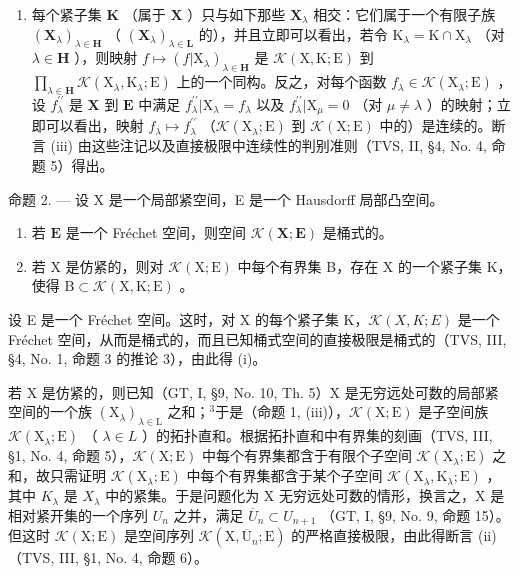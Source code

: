 \begin{enumerate}
\item
  每个紧子集 \(\mathbf{K}\) （属于 \(\mathbf{X}\) ）只与如下那些 \(\mathbf{X}_{\lambda}\) 相交：它们属于一个有限子族 \((\mathbf{X}_{\lambda})_{\lambda \in \mathbf{H}}\) （ \((\mathbf{X}_{\lambda})_{\lambda \in \mathbf{L}}\) 的），并且立即可以看出，若令 \(\mathrm{K}_{\lambda} = \mathrm{K} \cap \mathrm{X}_{\lambda}\) （对 \(\lambda \in \mathbf{H}\) ），则映射 \(f \mapsto (f|\mathrm{X}_{\lambda})_{\lambda \in \mathbf{H}}\) 是 \(\mathcal{K}(\mathrm{X},\mathrm{K};\mathrm{E})\) 到 \(\prod_{\lambda \in \mathbf{H}} \mathcal{K}(\mathrm{X}_{\lambda},\mathrm{K}_{\lambda};\mathrm{E})\) 上的一个同构。反之，对每个函数 \(f_{\lambda} \in \mathcal{K}(\mathrm{X}_{\lambda};\mathrm{E})\) ，设 \(f_{\lambda}^{\prime \prime}\) 是 \(\mathbf{X}\) 到 \(\mathbf{E}\) 中满足 \(f_{\lambda}^{\prime \prime}|\mathrm{X}_{\lambda} = f_{\lambda}\) 以及 \(f_{\lambda}^{\prime \prime}|\mathrm{X}_{\mu} = 0\) （对 \(\mu \neq \lambda\) ）的映射；立即可以看出，映射 \(f_{\lambda} \mapsto f_{\lambda}^{\prime \prime}\) （\(\mathcal{K}(\mathrm{X}_{\lambda};\mathrm{E})\) 到 \(\mathcal{K}(\mathrm{X};\mathrm{E})\) 中的）是连续的。断言 (iii) 由这些注记以及直接极限中连续性的判别准则（TVS, II, §4, No. 4, 命题 5）得出。
\end{enumerate}

命题 2. --- 设 X 是一个局部紧空间，E 是一个 Hausdorff 局部凸空间。

\begin{enumerate}
\def\labelenumi{(\roman{enumi})}
\item
  若 \(\mathbf{E}\) 是一个 Fréchet 空间，则空间 \(\mathcal{K}(\mathbf{X};\mathbf{E})\) 是桶式的。
\item
  若 X 是仿紧的，则对 \(\mathcal{K}(\mathrm{X};\mathrm{E})\) 中每个有界集 B，存在 X 的一个紧子集 K，使得 \(\mathrm{B}\subset \mathcal{K}(\mathrm{X},\mathrm{K};\mathrm{E})\) 。
\end{enumerate}

设 E 是一个 Fréchet 空间。这时，对 X 的每个紧子集 K，\(\mathcal{K}(X,K;E)\) 是一个 Fréchet 空间，从而是桶式的，而且已知桶式空间的直接极限是桶式的（TVS, III, §4, No. 1, 命题 3 的推论 3），由此得 (i)。

若 X 是仿紧的，则已知（GT, I, §9, No. 10, Th. 5）X 是无穷远处可数的局部紧空间的一个族 \((\mathrm{X}_{\lambda})_{\lambda \in \mathrm{L}}\) 之和；\(^{3}\)于是（命题 1, (iii)），\(\mathcal{K}(\mathrm{X};\mathrm{E})\) 是子空间族 \(\mathcal{K}(\mathrm{X}_{\lambda};\mathrm{E})\) （ \(\lambda \in L\) ）的拓扑直和。根据拓扑直和中有界集的刻画（TVS, III, §1, No. 4, 命题 5），\(\mathcal{K}(\mathrm{X};\mathrm{E})\) 中每个有界集都含于有限个子空间 \(\mathcal{K}(\mathrm{X}_{\lambda};\mathrm{E})\) 之和，故只需证明 \(\mathcal{K}(\mathrm{X}_{\lambda};\mathrm{E})\) 中每个有界集都含于某个子空间 \(\mathcal{K}(\mathrm{X}_{\lambda},\mathrm{K}_{\lambda};\mathrm{E})\) ，其中 \(K_{\lambda}\) 是 \(X_{\lambda}\) 中的紧集。于是问题化为 X 无穷远处可数的情形，换言之，X 是相对紧开集的一个序列 \(U_{n}\) 之并，满足 \(\overline{U}_{n} \subset U_{n+1}\) （GT, I, §9, No. 9, 命题 15）。但这时 \(\mathcal{K}(\mathrm{X};\mathrm{E})\) 是空间序列 \(\mathcal{K}(\mathrm{X},\overline{\mathrm{U}}_{n};\mathrm{E})\) 的严格直接极限，由此得断言 (ii)（TVS, III, §1, No. 4, 命题 6）。


